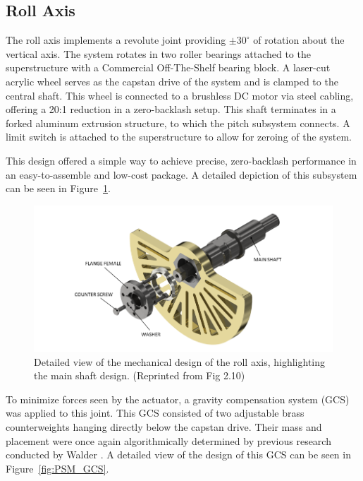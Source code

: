 \subsection{Roll Axis}
The roll axis implements a revolute joint providing $\pm 30^\circ$ of rotation about the vertical axis. The system rotates in two roller bearings attached to the superstructure with a Commercial Off-The-Shelf bearing block. A laser-cut acrylic wheel serves as the capstan drive of the system and is clamped to the central shaft. This wheel is connected to a brushless DC motor via steel cabling, offering a 20:1 reduction in a zero-backlash setup. This shaft terminates in a forked aluminum extrusion structure, to which the pitch subsystem connects. A limit switch is attached to the superstructure to allow for zeroing of the system.

This design offered a simple way to achieve precise, zero-backlash performance in an easy-to-assemble and low-cost package. A detailed depiction of this subsystem can be seen in Figure~\ref{fig:roll_detailed}.

\begin{figure}[H] %
    \centering
    \includegraphics[width=1.0\linewidth]{figures/roll_detailed.png}
    \caption{Detailed view of the mechanical design of the roll axis, highlighting the main shaft design. (Reprinted from \cite{walder2022design} Fig 2.10)}
    \label{fig:roll_detailed}
\end{figure}

To minimize forces seen by the actuator, a gravity compensation system (GCS) was applied to this joint. This GCS consisted of two adjustable brass counterweights hanging directly below the capstan drive. Their mass and placement were once again algorithmically determined by previous research conducted by Walder \cite{walder2022design}. A detailed view of the design of this GCS can be seen in Figure~\ref{fig:PSM_GCS}.

